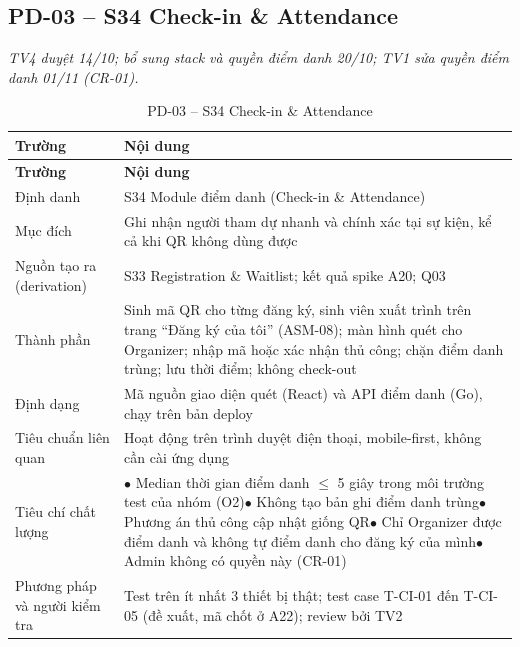 \subsection*{PD-03 -- S34 Check-in \& Attendance}
\noindent\textit{TV4 duyệt 14/10; bổ sung stack và quyền điểm danh 20/10; TV1 sửa quyền điểm danh 01/11 (CR-01).}

\begingroup\tblsetup\tblzebra
\begin{longtable}{L{3.4cm}L{11.6cm}}
\caption{PD-03 -- S34 Check-in \& Attendance}\label{tab:pd-03}\\
\toprule
{}\textbf{Trường} & \textbf{Nội dung} \\
\midrule
\endfirsthead
\toprule
{}\textbf{Trường} & \textbf{Nội dung} \\
\midrule
\endhead
\bottomrule
\endlastfoot
Định danh & S34 Module điểm danh (Check-in \& Attendance) \\
Mục đích & Ghi nhận người tham dự nhanh và chính xác tại sự kiện, kể cả khi QR không dùng được \\
Nguồn tạo ra (derivation) & S33 Registration \& Waitlist; kết quả spike A20; Q03 \\
Thành phần & Sinh mã QR cho từng đăng ký, sinh viên xuất trình trên trang \enquote{Đăng ký của tôi} (ASM-08); màn hình quét cho Organizer; nhập mã hoặc xác nhận thủ công; chặn điểm danh trùng; lưu thời điểm; không check-out \\
Định dạng & Mã nguồn giao diện quét (React) và API điểm danh (Go), chạy trên bản deploy \\
Tiêu chuẩn liên quan & Hoạt động trên trình duyệt điện thoại, mobile-first, không cần cài ứng dụng \\
Tiêu chí chất lượng & $\bullet$ Median thời gian điểm danh $\le$ 5 giây trong môi trường test của nhóm (O2)\newline $\bullet$ Không tạo bản ghi điểm danh trùng\newline $\bullet$ Phương án thủ công cập nhật giống QR\newline $\bullet$ Chỉ Organizer được điểm danh và không tự điểm danh cho đăng ký của mình\newline $\bullet$ Admin không có quyền này (CR-01) \\
Phương pháp và người kiểm tra & Test trên ít nhất 3 thiết bị thật; test case T-CI-01 đến T-CI-05 (đề xuất, mã chốt ở A22); review bởi TV2 \\
\end{longtable}
\endgroup

